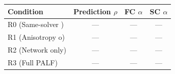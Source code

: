 \begin{tabular}{lccc}
\toprule
Condition & Prediction $\rho$ & FC $\alpha$ & SC $\alpha$ \\
\midrule
R0 (Same-solver ) & --- & --- & --- \\
R1 (Anisotropy o) & --- & --- & --- \\
R2 (Network only) & --- & --- & --- \\
R3 (Full PALF) & --- & --- & --- \\
\bottomrule
\end{tabular}